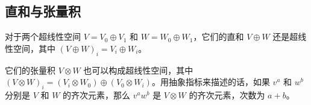 \subsection{直和与张量积}

对于两个超线性空间 $V=V_0\oplus V_1$ 和 $W=W_0\oplus W_1$，它们的直和 $V\oplus W$ 还是超线性空间，其中 $(V\oplus W)_i=V_i\oplus W_i$。

它们的张量积 $V\otimes W$ 也可以构成超线性空间，其中 $(V\otimes W)_i=(V_i\otimes W_0)\oplus(V_0\otimes W_i)$。用抽象指标来描述的话，如果 $v^a$ 和 $w^b$ 分别是 $V$ 和 $W$ 的齐次元素，那么 $v^aw^b$ 是 $V\otimes W$ 的齐次元素，次数为 $a+b$。























